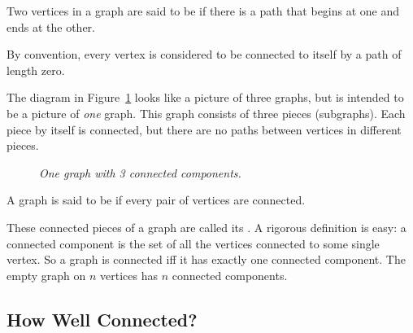 \begin{definition}
Two vertices in a graph are said to be  if there is a path
that begins at one and ends at the other.
\end{definition}

By convention, every vertex is considered to be connected to itself by a
path of length zero.

\iffalse

Now if there is a path from vertex $u$ to vertex $v$, then $v$ is
connected to $u$ by the reverse path, so connectedness is a symmetric
relation.  Also, if there is a path from $u$ to $v$, and also a path from
$v$ to $w$, then these two paths can be combined to form a path from $u$
to $w$.  So the connectedness relation is transitive.  It is also
reflexive, since every vertex is by definition connected to itself by a
path of length zero.
\fi

The diagram in Figure~\ref{fig:3comp} looks like a picture of three
graphs, but is intended to be a picture of \emph{one} graph.  This graph
consists of three pieces (subgraphs).  Each piece by itself is connected,
but there are no paths between vertices in different pieces.

\iffalse
\begin{figure}[htbp]
\mfigure{!}{1.5in}{figures/3comp.pdf}
\caption{\em One graph with 3 connected components.}
\label{fig:3comp}
\end{figure}
\fi

\begin{figure}[htbp] 
\caption{\em One graph with 3 connected components.}
\label{fig:3comp}
\end{figure}

\begin{definition}
A graph is said to be  if every pair of vertices are
connected.
\end{definition}

These connected pieces of a graph are called its .  A rigorous definition is easy: a connected component is the
set of all the vertices connected to some single vertex.  So a graph is
connected iff it has exactly one connected component.  The empty graph on
$n$ vertices has $n$ connected components.

\subsection{How Well Connected?}

